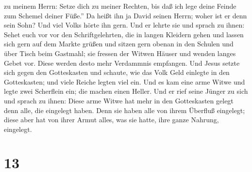 zu meinem Herrn: Setze dich zu meiner Rechten, bis daß ich lege deine
Feinde zum Schemel deiner Füße.''  Da heißt ihn ja David
seinen Herrn; woher ist er denn sein Sohn? Und viel Volks hörte ihn
gern.  Und er lehrte sie und sprach zu ihnen: Sehet euch
vor vor den Schriftgelehrten, die in langen Kleidern gehen und lassen
sich gern auf dem Markte grüßen  und sitzen gern obenan in
den Schulen und über Tisch beim Gastmahl;  sie fressen der
Witwen Häuser und wenden langes Gebet vor. Diese werden desto mehr
Verdammnis empfangen.  Und Jesus setzte sich gegen den
Gotteskasten und schaute, wie das Volk Geld einlegte in den
Gotteskasten; und viele Reiche legten viel ein.  Und es kam
eine arme Witwe und legte zwei Scherflein ein; die machen einen Heller.
 Und er rief seine Jünger zu sich und sprach zu ihnen:
Diese arme Witwe hat mehr in den Gotteskasten gelegt denn alle, die
eingelegt haben.  Denn sie haben alle von ihrem Überfluß
eingelegt; diese aber hat von ihrer Armut alles, was sie hatte, ihre
ganze Nahrung, eingelegt.

\hypertarget{section-12}{%
\section{13}\label{section-12}}

